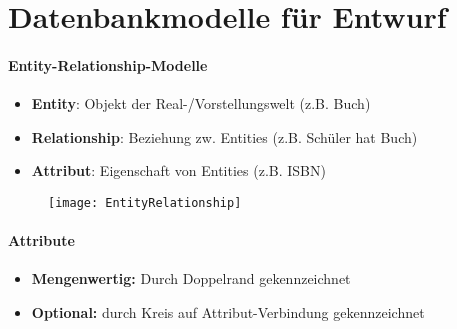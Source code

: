 \section{Datenbankmodelle für Entwurf}
\label{sec:entwurf}

\paragraph{Entity-Relationship-Modelle}
\begin{itemize}
	\item \textbf{Entity}: Objekt der Real-/Vorstellungswelt (z.B. Buch)
	\item \textbf{Relationship}: Beziehung zw. Entities (z.B. Schüler hat Buch)
	\item \textbf{Attribut}: Eigenschaft von Entities (z.B. ISBN)
\end{itemize}
\begin{figure}[H]\centering\label{EntityRelationship}\texttt{[image: EntityRelationship]}\end{figure}

\paragraph{Attribute}
\begin{itemize}
	\item \textbf{Mengenwertig:} Durch Doppelrand gekennzeichnet
	\item \textbf{Optional:} durch Kreis auf Attribut-Verbindung gekennzeichnet
\end{itemize}

